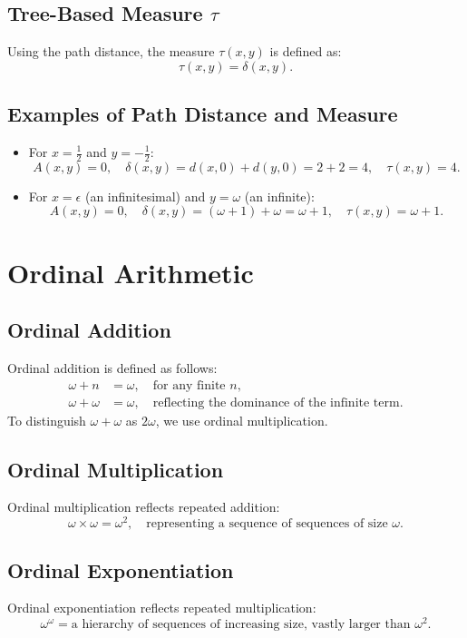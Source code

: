 \documentclass[12pt]{article}
\begin{document}
\subsection{Tree-Based Measure \( \tau \)}
Using the path distance, the measure \( \tau(x, y) \) is defined as:
\[
\tau(x, y) = \delta(x, y).
\]

\subsection{Examples of Path Distance and Measure}
\begin{itemize}
    \item For \( x = \frac{1}{2} \) and \( y = -\frac{1}{2} \):
    \[
    A(x, y) = 0, \quad \delta(x, y) = d(x, 0) + d(y, 0) = 2 + 2 = 4, \quad \tau(x, y) = 4.
    \]
    \item For \( x = \epsilon \) (an infinitesimal) and \( y = \omega \) (an infinite):
    \[
    A(x, y) = 0, \quad \delta(x, y) = (\omega + 1) + \omega = \omega + 1, \quad \tau(x, y) = \omega + 1.
    \]
\end{itemize}

\section{Ordinal Arithmetic}

\subsection{Ordinal Addition}
Ordinal addition is defined as follows:
\begin{align*}
    \omega + n & = \omega, \quad \text{for any finite } n, \\
    \omega + \omega & = \omega, \quad \text{reflecting the dominance of the infinite term.}
\end{align*}
To distinguish \( \omega + \omega \) as \( 2\omega \), we use ordinal multiplication.

\subsection{Ordinal Multiplication}
Ordinal multiplication reflects repeated addition:
\[
\omega \times \omega = \omega^2, \quad \text{representing a sequence of sequences of size } \omega.
\]

\subsection{Ordinal Exponentiation}
Ordinal exponentiation reflects repeated multiplication:
\[
\omega^\omega = \text{a hierarchy of sequences of increasing size, vastly larger than } \omega^2.
\]
\end{document}
